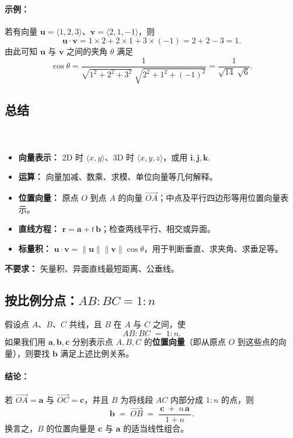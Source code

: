\documentclass[8pt,a4paper,twoside]{tau-class/tau}
\begin{document}
\paragraph{示例：}
若有向量 \(\mathbf{u}=\langle 1,2,3\rangle\)、\(\mathbf{v}=\langle 2,1,−1\rangle\)，则
\[
\mathbf{u}\cdot\mathbf{v} = 1\times 2 + 2\times 1 + 3\times (−1) = 2+2−3=1.
\]
由此可知 \(\mathbf{u}\) 与 \(\mathbf{v}\) 之间的夹角 \(\theta\) 满足
\[
\cos\theta = \frac{1}{\sqrt{1^2+2^2+3^2}\;\sqrt{2^2+1^2+(−1)^2}} = \frac{1}{\sqrt{14}\;\sqrt{6}}.
\]

\subsection{总结}
\\
\paragraph{}
\begin{itemize}
    \item \textbf{向量表示：} 2D 时 \(\langle x,y\rangle\)、3D 时 \(\langle x,y,z\rangle\)，或用 \(\mathbf{i},\mathbf{j},\mathbf{k}\).
    \item \textbf{运算：} 向量加减、数乘、求模、单位向量等几何解释。
    \item \textbf{位置向量：} 原点 \(O\) 到点 \(A\) 的向量 \(\overrightarrow{OA}\)；中点及平行四边形等用位置向量表示。
    \item \textbf{直线方程：} \(\mathbf{r}=\mathbf{a}+t\,\mathbf{b}\)；检查两线平行、相交或异面。
    \item \textbf{标量积：} \(\mathbf{u}\cdot\mathbf{v}=\|\mathbf{u}\|\|\mathbf{v}\|\cos\theta\)，用于判断垂直、求夹角、求垂足等。
\end{itemize}
\textbf{不要求：} 矢量积、异面直线最短距离、公垂线。
\subsection{按比例分点：\(AB : BC = 1 : n\)}

假设点 \(A\)、\(B\)、\(C\) 共线，且 \(B\) 在 \(A\) 与 \(C\) 之间，使
\[
AB : BC \;=\; 1 : n.
\]
如果我们用 \(\mathbf{a}, \mathbf{b}, \mathbf{c}\) 分别表示点 \(A,B,C\) 的\textbf{位置向量}（即从原点 \(O\) 到这些点的向量），则要找 \(\mathbf{b}\) 满足上述比例关系。

\paragraph{结论：}
若 \(\overrightarrow{OA}=\mathbf{a}\) 与 \(\overrightarrow{OC}=\mathbf{c}\)，并且 \(B\) 为将线段 \(AC\) 内部分成 \(1:n\) 的点，则
\[
\mathbf{b} \;=\; \overrightarrow{OB}
\;=\;
\frac{\,\mathbf{c} \;+\; n\,\mathbf{a}\,}{\,1 + n\,}.
\]
换言之，\(B\) 的位置向量是 \(\mathbf{c}\) 与 \(\mathbf{a}\) 的适当线性组合。
\end{document}
